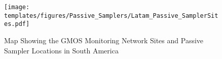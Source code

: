\begin{figure}[H]
  \texttt{[image: templates/figures/Passive\_Samplers/Latam\_Passive\_SamplerSites.pdf]}
  \caption{Map Showing the GMOS Monitoring Network Sites and Passive Sampler Locations in South America}
  \label{fig:GMOS_stations_map}
  \centering
  
\end{figure}
\FloatBarrier





  

